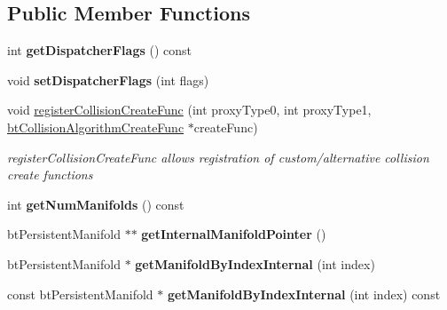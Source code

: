 \subsection*{Public Member Functions}
\begin{DoxyCompactItemize}
\item 
\mbox{\label{classbtCollisionDispatcher_a0fdfc28037e8604354fe8ba2ff6ec33b}} 
int {\bfseries get\+Dispatcher\+Flags} () const
\item 
\mbox{\label{classbtCollisionDispatcher_acf7d7afab71d8ffb37e8c3ed8613eebe}} 
void {\bfseries set\+Dispatcher\+Flags} (int flags)
\item 
\mbox{\label{classbtCollisionDispatcher_ac754ecadc2116cdf75d63c207937aeac}} 
void \hyperlink{classbtCollisionDispatcher_ac754ecadc2116cdf75d63c207937aeac}{register\+Collision\+Create\+Func} (int proxy\+Type0, int proxy\+Type1, \hyperlink{structbtCollisionAlgorithmCreateFunc}{bt\+Collision\+Algorithm\+Create\+Func} $\ast$create\+Func)
\begin{DoxyCompactList}\small\item\em register\+Collision\+Create\+Func allows registration of custom/alternative collision create functions \end{DoxyCompactList}\item 
\mbox{\label{classbtCollisionDispatcher_ac11a4cf972b7763a6e553283b5f0adcd}} 
int {\bfseries get\+Num\+Manifolds} () const
\item 
\mbox{\label{classbtCollisionDispatcher_a9e23bf05bc964dc1089a5f70866dff58}} 
bt\+Persistent\+Manifold $\ast$$\ast$ {\bfseries get\+Internal\+Manifold\+Pointer} ()
\item 
\mbox{\label{classbtCollisionDispatcher_aed433cc0bfb5b2ff446dcac3091cb321}} 
bt\+Persistent\+Manifold $\ast$ {\bfseries get\+Manifold\+By\+Index\+Internal} (int index)
\item 
\mbox{\label{classbtCollisionDispatcher_a1d51e66204277cdd577c6efdd1e35611}} 
const bt\+Persistent\+Manifold $\ast$ {\bfseries get\+Manifold\+By\+Index\+Internal} (int index) const
$$
\end{DoxyCompactItemize}
